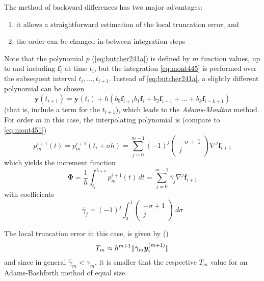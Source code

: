 The method of backward differences has two major advantages:
\begin{enumerate}
    \item it allows a straightforward estimation of the local truncation error, and
    \item the order can be changed in-between integration steps
\end{enumerate}

Note that the polynomial $p$ (\autoref{eq:butcher241a}) is defined by $m$
function values, up to and including $\bm{f}_i$ at time $t_i$, but the integration 
\autoref{eq:mont445} is performed over the subsequent interval $t_i , \dots , t_{i+1}$.
Instead of \autoref{eq:butcher241a}, a slightly different polynomial can be chosen
\begin{equation}\label{eq:butcher241b}
    \bm{y}(t_{i+1}) = \bm{y}(t_i) + h \left( b_0 \bm{f}_{i+1} b_1 \bm{f}_i + b_2 \bm{f}_{i-1} + \dots + b_k \bm{f}_{i-k+1} \right)
\end{equation}
(that is, include a term for the $t_{i+1}$), which leads to the \emph{Adams-Moulton} 
method. For order $m$ in this case, the interpolating polynomial is (compare to 
\autoref{eq:mont451})
\begin{equation}\label{eq:mont461}
    p^{i+1}_{m}(t) = p^{i+1}_{m}(t_i + \sigma h) = \sum_{j=0}^{m-1} \left(-1\right)^j 
    \begin{pmatrix}-\sigma +1\\ j \end{pmatrix} \nabla ^j \bm{f}_{i+1}
\end{equation}
which yields the increment function
\begin{equation}\label{eq:mont462}
    \bm{\Phi} = \frac{1}{h} \int_{t_i}^{t_{i+h}} p^{i+1}_{m}(t) \,dt 
    = \sum_{j=0}^{m-1} \bar{\gamma}_j \nabla ^j \bm{f}_{i+1}
\end{equation}
with coefficients
\begin{equation}\label{eq:mont463}
    \bar{\gamma}_j = \left( -1 \right)^j \int_{0}^{1} \begin{pmatrix}-\sigma +1 \\ j \end{pmatrix} \,d\sigma
\end{equation}

The local truncation error in this case, is given by (\cite{Montenbruck2000})
\begin{equation}
    T_{m} \approx h^{m+1} \lVert\hat{\gamma}_m \bm{y}^{(m+1)}_i\rVert
\end{equation}
and since in general $\hat{\gamma}_m < \gamma _m$, it is smaller that the respective 
$T_m$ value for an Adams-Bashforth method of equal size.

